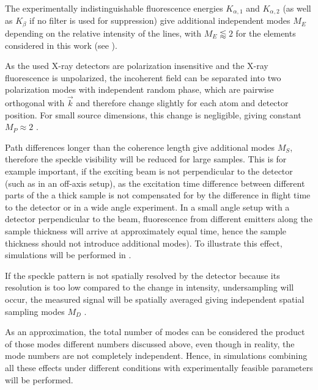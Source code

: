 The experimentally indistinguishable fluorescence energies $K_{\alpha,1}$ and $K_{\alpha,2}$ (as well as  $K_\beta$ if no filter is used for suppression) give additional independent modes $M_E$ depending on the relative intensity of the lines, with $M_E \lessapprox 2$ for the elements considered in this work (see ).

As the used X-ray detectors are polarization insensitive and the X-ray fluorescence is unpolarized, the incoherent field can be separated into two polarization modes with independent random phase, which are pairwise orthogonal with $\vec{k}$ and therefore change slightly for each atom and detector position. For small source dimensions, this change is negligible,  giving constant $M_P \approx 2$ \cite{classen2019}. 

Path differences longer than the coherence length give additional modes $M_S$, therefore the speckle visibility will be reduced for large samples. This is for example important, if the exciting beam is not perpendicular to the detector (such as in an off-axis setup), as the excitation time difference between different parts of the a thick sample is not compensated for by the difference in flight time to the detector or in a wide angle experiment. In a small angle setup with a detector perpendicular to the beam, fluorescence from different emitters along the sample thickness will arrive at approximately equal time, hence the sample thickness should not introduce additional modes). To illustrate this effect, simulations will be performed in .

If the speckle pattern is not spatially resolved by the detector because its resolution is too low compared to the change in intensity, undersampling will occur, the measured signal will be spatially averaged giving independent spatial sampling modes $M_D$ \cite{goodman2007}.

As an approximation, the total number of modes can be considered the product of those modes different numbers discussed above, even though in reality, the mode numbers are not completely independent.
Hence, in  simulations combining all these effects under different conditions with experimentally feasible  parameters will be performed.


